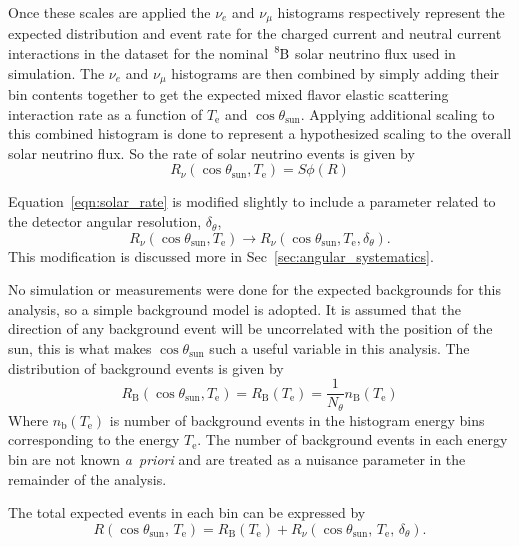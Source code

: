 Once these scales are applied the $\nu_{e}$ and $\nu_{\mu}$ histograms
respectively  represent the expected distribution and event rate for the charged current
and neutral current interactions in the dataset for the nominal $\ce{^{8}B}$
solar neutrino flux used in simulation.
The $\nu_{e}$ and $\nu_{\mu}$ histograms are then combined by
simply adding their bin contents together to get the expected
mixed flavor elastic scattering interaction rate as a function
of $T_{\mathrm{e}}$ and $\cos\theta_{\mathrm{sun}}$.
Applying additional scaling to this combined histogram is done to represent
a hypothesized scaling to the overall solar neutrino flux.
So the rate of solar neutrino events is given by
\begin{equation}
    R_{\nu}(\cos\theta_{\mathrm{sun}}, T_{\mathrm{e}}) =
    S\phi(R)
    \label{eqn:solar_rate}
\end{equation}

Equation~\eqref{eqn:solar_rate} is modified slightly to include a parameter
related to the detector angular resolution, $\delta_{\theta}$,
\begin{equation}
R_{\nu}(\cos\theta_{\mathrm{sun}}, T_{\mathrm{e}}) \rightarrow
    R_{\nu}(\cos\theta_{\mathrm{sun}}, T_{\mathrm{e}}, \delta_{\theta})\text{.}
\end{equation}
This modification is discussed more in Sec~\ref{sec:angular_systematics}.

No simulation or measurements were done for the expected backgrounds for this analysis,
so a simple background model is adopted.
It is assumed that the direction of any background event will be uncorrelated
with the position of the sun, this is what makes $\cos\theta_{\mathrm{sun}}$ such a
useful variable in this analysis.
The distribution of background events is given by
\begin{equation}
    R_{\mathrm{B}}(\cos\theta_{\mathrm{sun}}, T_{\mathrm{e}}) =
    R_{\mathrm{B}}(T_{\mathrm{e}}) = \frac{1}{N_\theta}n_{\mathrm{B}}(T_{\mathrm{e}})
\end{equation}
Where $n_{\mathrm{b}}(T_{\mathrm{e}})$ is number of background events in the
histogram energy bins corresponding to the energy $T_{\mathrm{e}}$.
The number of background events in each energy bin are not known \textit{a~priori}
and are treated as a nuisance parameter in the remainder of the analysis.

The total expected events in each bin can be expressed by
\begin{equation}
    R(\cos\theta_{\mathrm{sun}}\text{, }T_{\mathrm{e}}) =
    R_{\mathrm{B}}(T_{\mathrm{e}}) + R_{\nu}(\cos\theta_{\mathrm{sun}}\text{, }T_{\mathrm{e}}\text{, }\delta_{\theta})\text{.}
    \label{eqn:event_rate}
\end{equation}

